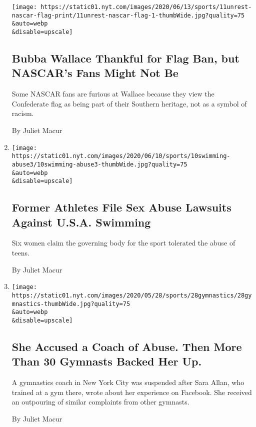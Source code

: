 \begin{enumerate}
  \texttt{[image: https://static01.nyt.com/images/2020/06/13/sports/11unrest-nascar-flag-print/11unrest-nascar-flag-1-thumbWide.jpg?quality=75\\\&auto=webp\\\&disable=upscale]}

  \hypertarget{bubba-wallace-thankful-for-flag-ban-but-nascars-fans-might-not-be}{%
  \subsection{Bubba Wallace Thankful for Flag Ban, but NASCAR's Fans
  Might Not
  Be}\label{bubba-wallace-thankful-for-flag-ban-but-nascars-fans-might-not-be}}

  Some NASCAR fans are furious at Wallace because they view the
  Confederate flag as being part of their Southern heritage, not as a
  symbol of racism.

  By Juliet Macur
\item
  \href{/2020/06/10/sports/olympics/swimming-abuse-coaches-lawsuit.html}{}

  \texttt{[image: https://static01.nyt.com/images/2020/06/10/sports/10swimming-abuse3/10swimming-abuse3-thumbWide.jpg?quality=75\\\&auto=webp\\\&disable=upscale]}

  \hypertarget{former-athletes-file-sex-abuse-lawsuits-against-usa-swimming}{%
  \subsection{Former Athletes File Sex Abuse Lawsuits Against U.S.A.
  Swimming}\label{former-athletes-file-sex-abuse-lawsuits-against-usa-swimming}}

  Six women claim the governing body for the sport tolerated the abuse
  of teens.

  By Juliet Macur
\item
  \href{/2020/05/29/sports/gymnastics-emotional-abuse-chelsea-piers.html}{}

  \texttt{[image: https://static01.nyt.com/images/2020/05/28/sports/28gymnastics/28gymnastics-thumbWide.jpg?quality=75\\\&auto=webp\\\&disable=upscale]}

  \hypertarget{she-accused-a-coach-of-abuse-then-more-than-30-gymnasts-backed-her-up}{%
  \subsection{She Accused a Coach of Abuse. Then More Than 30 Gymnasts
  Backed Her
  Up.}\label{she-accused-a-coach-of-abuse-then-more-than-30-gymnasts-backed-her-up}}

  A gymnastics coach in New York City was suspended after Sara Allan,
  who trained at a gym there, wrote about her experience on Facebook.
  She received an outpouring of similar complaints from other gymnasts.

  By Juliet Macur
\end{enumerate}

